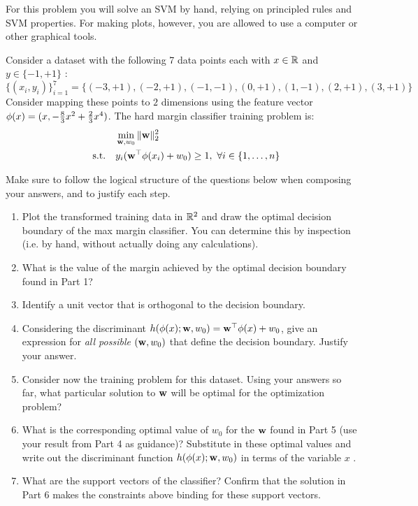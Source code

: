 \documentclass[submit]{harvardml}
\begin{document}
\begin{problem}

  For this problem you will solve an SVM by hand, relying on principled rules and SVM properties. 
  For making plots, however, you are allowed to use a computer or other graphical tools.

Consider a dataset with the following 7 data points each with $x \in \mathbb{R}$ and $y \in \{ -1, +1 \}$ : \[\{(x_i, y_i)\}_{i = 1}^7 =\{(-3 , +1) , (-2 , +1 ) , (-1,  -1 ), (0, +1), ( 1 , -1 ), ( 2 , +1 ) , (3 , +1 )\}\] Consider
mapping these points to $2$ dimensions using the feature vector $\mathbf{\phi}(x) =  (x, -\frac{8}{3}x^2 + \frac{2}{3}x^4 )$. The hard margin classifier training problem is:
%
\begin{align*}
  &\min_{\mathbf{w}, w_0} \|\mathbf{w}\|_2^2 \label{eq:dcp} \\
  \quad \text{s.t.} \quad & y_i(\mathbf{w}^\top \mathbf{\phi}(x_i) + w_0) \geq 1,~\forall i \in \{1,\ldots, n\}\notag
\end{align*}

Make sure to follow the logical structure of
the questions below when composing your answers, and to justify each step.

\begin{enumerate}
\item Plot the transformed training data in $\mathbb{R}^2$ and draw the optimal decision boundary
of the max margin classifier. You can determine this by inspection (i.e. by hand, without actually doing any calculations).

\item  What is the value of the margin achieved by the optimal
decision boundary found in Part 1? 

\item Identify a unit vector that is orthogonal to the decision boundary.

\item Considering the discriminant $h(\mathbf{\phi}(x);\mathbf{w},w_0)=\mathbf{w}^\top\mathbf{\phi}(x) +w_0$, 
give an expression for {\em all possible} $(\mathbf{w},w_0)$ that define
the decision boundary. Justify your answer.

  \item Consider now the training problem for this dataset. Using your answers so far,
    what particular solution to $\mathbf{w}$ will be optimal for the
    optimization problem?

  \item What is the corresponding optimal value of $w_0$ for the $\mathbf{w}$ found in Part 5 (use your result from Part 4 as guidance)? Substitute in these optimal values and write out the discriminant function
    $h(\mathbf{\phi}(x);\mathbf{w},w_0)$ in terms of the variable $x$ .


\item What are the support vectors of the classifier?  Confirm that
  the solution in Part 6 makes the constraints above binding for these
  support vectors.

\end{enumerate}

\end{problem}
\end{document}
